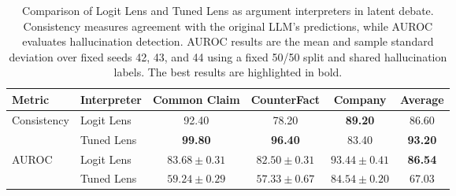 \begin{table}[t]
    \centering
    \tiny
    \setlength{\tabcolsep}{4mm}
    \begin{tabular}{llcccc}
        \toprule
        \textbf{Metric} & \textbf{Interpreter}
        & \textbf{Common Claim} & \textbf{CounterFact}
        & \textbf{Company} & \textbf{Average} \\
        \midrule
        \multirow{2}{*}{Consistency}
        & Logit Lens & 92.40 & 78.20 & \textbf{89.20} & 86.60 \\
        & Tuned Lens & \textbf{99.80} & \textbf{96.40} & 83.40 & \textbf{93.20} \\
        \midrule
        \multirow{2}{*}{AUROC}
        & Logit Lens
        & $\mathbf{83.68 \pm 0.31}$
        & $\mathbf{82.50 \pm 0.31}$
        & $\mathbf{93.44 \pm 0.41}$
        & \textbf{86.54} \\
        & Tuned Lens
        & $59.24 \pm 0.29$
        & $57.33 \pm 0.67$
        & $84.54 \pm 0.20$
        & 67.03 \\
        \bottomrule
    \end{tabular}
    \caption{Comparison of Logit Lens and Tuned Lens as argument interpreters in latent debate. Consistency measures agreement with the original LLM's predictions, while AUROC evaluates hallucination detection. AUROC results are the mean and sample standard deviation over fixed seeds 42, 43, and 44 using a fixed 50/50 split and shared hallucination labels. The best results are highlighted in bold.}
    \label{tab:interpreter_comparison}
\end{table}
